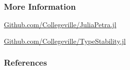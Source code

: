 \documentclass[17pt]{beamer}
\begin{document}
\begin{frame}%
	\frametitle{More Information}
	\begin{center}
		\small
		\url{Github.com/Collegeville/JuliaPetra.jl}
		
		\bigskip
		
		\url{Github.com/Collegeville/TypeStability.jl}
	\end{center}
\end{frame}
\begin{frame}[allowframebreaks]
	\frametitle{References}

	
	\small

\end{frame}
\end{document}
